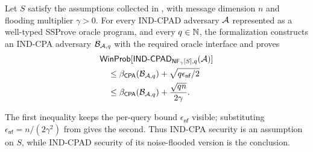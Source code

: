 \begin{theorem}
\label{thm:main}
Let \(S\) satisfy the assumptions collected in , with
message dimension \(n\) and flooding multiplier \(\gamma>0\).
For every IND-CPAD adversary \(\mathcal{A}\) represented as a well-typed SSProve oracle
program, and every \(q\in\mathbb{N}\), the formalization constructs an IND-CPA adversary
\(\mathcal{B}_{\mathcal{A},q}\) with the required oracle interface and proves
\begin{align*}
 &\mathsf{WinProb}[
   \mathsf{IND\text{-}CPAD}_{\mathsf{NF}_{\gamma}[S],q}(\mathcal{A})]\\
 &\quad\leq \beta_{\mathsf{CPA}}(\mathcal{B}_{\mathcal{A},q})
       +\sqrt{q\epsilon_{\mathsf{nf}}/2}\\
 &\quad\leq \beta_{\mathsf{CPA}}(\mathcal{B}_{\mathcal{A},q})
       +\frac{\sqrt{qn}}{2\gamma}.
\end{align*}
\end{theorem}

The first inequality keeps the per-query bound
\(\epsilon_{\mathsf{nf}}\) visible; substituting
\(\epsilon_{\mathsf{nf}}=n/(2\gamma^2)\) from  gives the
second.
Thus IND-CPA security is an assumption on \(S\), while IND-CPAD security of its
noise-flooded version is the conclusion.

\FloatBarrier
